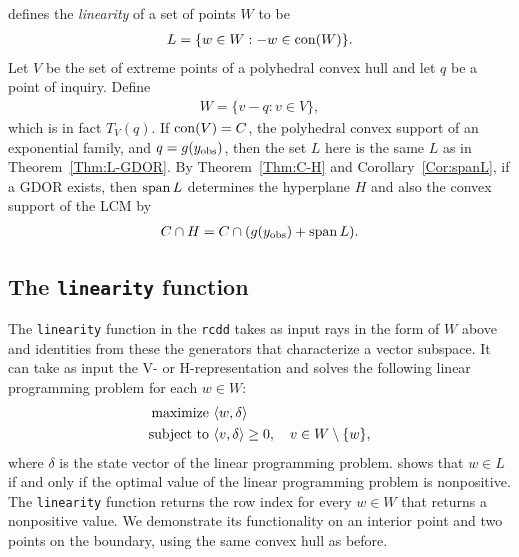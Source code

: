 \citet{Geyer:gdor} defines the \emph{linearity} of a set of points $W$ to be
\begin{align*}
	L = \{ w \in W: -w \in \operatorname{con}( W ) \}.
\end{align*}
Let $V$ be the set of extreme points of a polyhedral convex hull and let $q$ be a point of inquiry.
Define 
\begin{align*}
W = \{ v - q: v \in V \},
\end{align*}
which is in fact $T_V(q)$.  If $\operatorname{con}( V ) = C$, the
polyhedral convex support of an exponential family, and $q = g(y_{\text{obs}})$, then the set 
$L$ here is the same $L$ as in Theorem~\ref{Thm:L-GDOR}.    
By Theorem~\ref{Thm:C-H} and Corollary~\ref{Cor:spanL}, if a GDOR 
exists, then $\operatorname{span} L$  
determines the hyperplane $H$ and also the convex support of the LCM by
\begin{align*}
	C \cap H = C \cap (g(y_{\text{obs}}) + \operatorname{span} L).
\end{align*}

\subsection{The \texttt{linearity} function}
The \texttt{linearity} function in the \texttt{rcdd} takes as input rays in 
the form of $W$ above and identities from these the generators that characterize
a vector subspace.  It can take as input the V- or H-representation and solves the 
following linear programming problem for each $w \in W$:
\begin{align*}
	\text{maximize } 	&\langle w,\delta \rangle\\
	\text{subject to } 	&\langle v,\delta \rangle \geq 0, \quad v \in W \setminus \{w\},
\end{align*}
where $\delta$ is the state vector of the linear programming problem.  \citet{Geyer:gdor}
shows that $w \in L$ if and only if the optimal value of the linear programming problem is 
nonpositive.  The \texttt{linearity} function returns the row index for every $w \in W$
that returns a nonpositive value.
We demonstrate its functionality on an interior
point and two points on the boundary, using the same convex hull as before.

